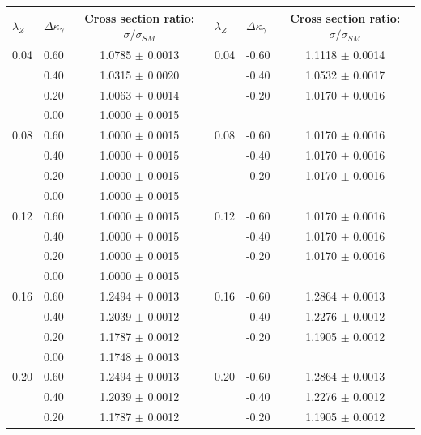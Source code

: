 \begin{table}[h]
\begin{center}
  \begin{tabular}{l l c | l l c}
    \hline  \hline
    $\lambda_Z$  &  $\Delta{\kappa_\gamma}$  & Cross section ratio: $\sigma/\sigma_{SM}$ & 
    $\lambda_Z$  &  $\Delta{\kappa_\gamma}$  & Cross section ratio: $\sigma/\sigma_{SM}$\\\hline
0.04 & 0.60 & 1.0785 $\pm$ 0.0013 & 0.04 & -0.60 & 1.1118 $\pm$ 0.0014 \\ 
     & 0.40 & 1.0315 $\pm$ 0.0020 &      & -0.40 & 1.0532 $\pm$ 0.0017 \\ 
     & 0.20 & 1.0063 $\pm$ 0.0014 &      & -0.20 & 1.0170 $\pm$ 0.0016 \\ 
     & 0.00 & 1.0000 $\pm$ 0.0015 &      &       &                      \\ \hline
0.08 & 0.60 & 1.0000 $\pm$ 0.0015 & 0.08 & -0.60 & 1.0170 $\pm$ 0.0016 \\ 
     & 0.40 & 1.0000 $\pm$ 0.0015 &      & -0.40 & 1.0170 $\pm$ 0.0016 \\ 
     & 0.20 & 1.0000 $\pm$ 0.0015 &      & -0.20 & 1.0170 $\pm$ 0.0016 \\ 
     & 0.00 & 1.0000 $\pm$ 0.0015 &      &       &                     \\ \hline
0.12 & 0.60 & 1.0000 $\pm$ 0.0015 & 0.12 & -0.60 & 1.0170 $\pm$ 0.0016 \\ 
     & 0.40 & 1.0000 $\pm$ 0.0015 &      & -0.40 & 1.0170 $\pm$ 0.0016 \\ 
     & 0.20 & 1.0000 $\pm$ 0.0015 &      & -0.20 & 1.0170 $\pm$ 0.0016 \\ 
     & 0.00 & 1.0000 $\pm$ 0.0015 &      &       &                     \\ \hline
0.16 & 0.60 & 1.2494 $\pm$ 0.0013 & 0.16 & -0.60 & 1.2864 $\pm$ 0.0013 \\ 
     & 0.40 & 1.2039 $\pm$ 0.0012 &      & -0.40 & 1.2276 $\pm$ 0.0012 \\ 
     & 0.20 & 1.1787 $\pm$ 0.0012 &      & -0.20 & 1.1905 $\pm$ 0.0012 \\ 
     & 0.00 & 1.1748 $\pm$ 0.0013 &      &       &                     \\ \hline
0.20 & 0.60 & 1.2494 $\pm$ 0.0013 & 0.20 & -0.60 & 1.2864 $\pm$ 0.0013 \\ 
     & 0.40 & 1.2039 $\pm$ 0.0012 &      & -0.40 & 1.2276 $\pm$ 0.0012 \\ 
     & 0.20 & 1.1787 $\pm$ 0.0012 &      & -0.20 & 1.1905 $\pm$ 0.0012 \\ 

\end{tabular}
\end{center}
\end{table}
